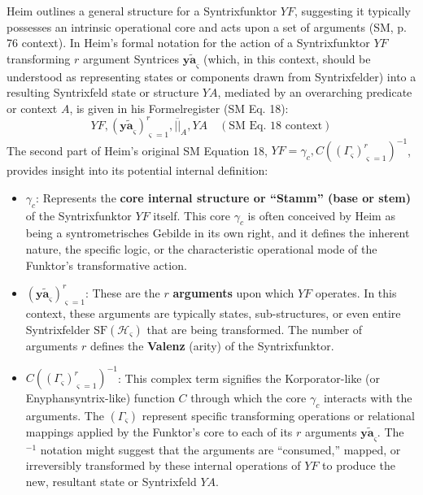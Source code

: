 \documentclass[
    12pt,              %
    a4paper,           %
    headings=normal,   %
    twoside=true,      %
    BCOR=8mm,          %
]{scrbook}
\newcommand{\q}[1]{\enquote{#1}}
\newcommand{\syntrixfunktor}{YF}
\begin{document}
Heim outlines a general structure for a Syntrixfunktor \(\syntrixfunktor\), suggesting it typically possesses an intrinsic operational core and acts upon a set of arguments (SM, p. 76 context). In Heim's formal notation for the action of a Syntrixfunktor \(\syntrixfunktor\) transforming \(r\) argument Syntrices \(\bm{y\widetilde{a}}_\varsigma\) (which, in this context, should be understood as representing states or components drawn from Syntrixfelder) into a resulting Syntrixfeld state or structure \(YA\), mediated by an overarching predicate or context \(A\), is given in his Formelregister (SM Eq. 18):
\begin{equation} \label{eq:original_syntrixfunktor_action_revised_2} 
\syntrixfunktor, (\bm{y\widetilde{a}}_\varsigma)^r_{\varsigma=1}, \overline{||}_A, YA \quad (\text{SM Eq. 18 context})
\end{equation}
The second part of Heim's original SM Equation 18, \(\syntrixfunktor = \gamma_c, C( (\Gamma_\varsigma)^r_{\varsigma=1} )^{-1}\), provides insight into its potential internal definition:
\begin{itemize}
    \item   \(\gamma_c\): Represents the \textbf{core internal structure or \q{Stamm} (base or stem)} of the Syntrixfunktor \(\syntrixfunktor\) itself. This core \(\gamma_c\) is often conceived by Heim as being a syntrometrisches Gebilde in its own right, and it defines the inherent nature, the specific logic, or the characteristic operational mode of the Funktor's transformative action.
    \item   \((\bm{y\widetilde{a}}_\varsigma)^r_{\varsigma=1}\): These are the \(r\) \textbf{arguments} upon which \(\syntrixfunktor\) operates. In this context, these arguments are typically states, sub-structures, or even entire Syntrixfelder \(\text{SF}(\mathcal{H}_\varsigma)\) that are being transformed. The number of arguments \(r\) defines the \textbf{Valenz} (arity) of the Syntrixfunktor.
    \item   \(C( (\Gamma_\varsigma)^r_{\varsigma=1} )^{-1}\): This complex term signifies the Korporator-like (or Enyphansyntrix-like) function \(C\) through which the core \(\gamma_c\) interacts with the arguments. The \((\Gamma_\varsigma)\) represent specific transforming operations or relational mappings applied by the Funktor's core to each of its \(r\) arguments \(\bm{y\widetilde{a}}_\varsigma\). The \(^{-1}\) notation might suggest that the arguments are \q{consumed,} mapped, or irreversibly transformed by these internal operations of \(\syntrixfunktor\) to produce the new, resultant state or Syntrixfeld \(YA\).
\end{itemize}
\end{document}
